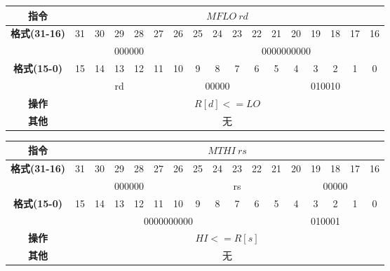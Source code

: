 \documentclass[11pt,utf8]{article}
\begin{document}
\begin{center}
\begin{tabular}{|c|c|c|c|c|c|c|c|c|c|c|c|c|c|c|c|c|}
\hline
\textbf{指令} & \multicolumn{16}{c|}{$MFLO~rd$} \\
\hline
\multirow{2}{*}{\textbf{格式(31-16)}} & 31 & 30 & 29 & 28 & 27 & 26 & 25 & 24 & 23 & 22 & 21 & 20 & 19 & 18 & 17 & 16 \\ 
\cline{2-17}
& \multicolumn{6}{c|}{000000} & \multicolumn{10}{c|}{0000000000} \\
\hline
\multirow{2}{*}{\textbf{格式(15-0)}} & 15 & 14 & 13 & 12 & 11 & 10 & 9 & 8 & 7 & 6 & 5 & 4 & 3 & 2 & 1 & 0 \\
\cline{2-17}
& \multicolumn{5}{c|}{rd}& \multicolumn{5}{c|}{00000}& \multicolumn{6}{c|}{010010}\\
\hline
\textbf{操作} & \multicolumn{16}{c|}{$R[d]<=LO$} \\
\hline
\textbf{其他} & \multicolumn{16}{c|}{无} \\
\hline
\end{tabular}
\end{center}

\begin{center}
\begin{tabular}{|c|c|c|c|c|c|c|c|c|c|c|c|c|c|c|c|c|}
\hline
\textbf{指令} & \multicolumn{16}{c|}{$MTHI~rs$} \\
\hline
\multirow{2}{*}{\textbf{格式(31-16)}} & 31 & 30 & 29 & 28 & 27 & 26 & 25 & 24 & 23 & 22 & 21 & 20 & 19 & 18 & 17 & 16 \\ 
\cline{2-17}
& \multicolumn{6}{c|}{000000} & \multicolumn{5}{c|}{rs}& \multicolumn{5}{c|}{00000} \\
\hline
\multirow{2}{*}{\textbf{格式(15-0)}} & 15 & 14 & 13 & 12 & 11 & 10 & 9 & 8 & 7 & 6 & 5 & 4 & 3 & 2 & 1 & 0 \\
\cline{2-17}
& \multicolumn{10}{c|}{0000000000}& \multicolumn{6}{c|}{010001}\\
\hline
\textbf{操作} & \multicolumn{16}{c|}{$HI<=R[s]$} \\
\hline
\textbf{其他} & \multicolumn{16}{c|}{无} \\
\hline
\end{tabular}
\end{center}
\end{document}
